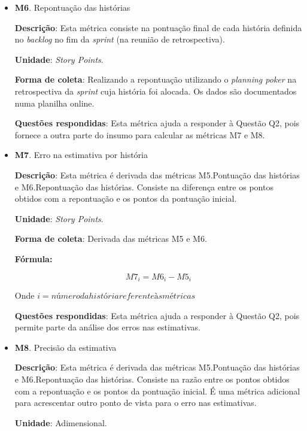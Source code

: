 \begin{itemize}
	 \item \textbf{M6}. Repontuação das histórias
	   
	   \subitem \textbf{Descrição}: Esta métrica consiste na pontuação final de cada história definida no \textit{backlog} no fim
		    da \textit{sprint} (na reunião de retrospectiva).
	   
	   \subitem \textbf{Unidade}: \textit{Story Points}.
	   
	   \subitem \textbf{Forma de coleta}: Realizando a repontuação utilizando o \textit{planning poker} na retrospectiva da \textit{sprint}
		    cuja história foi alocada. Os dados são documentados numa planilha online.
	   
	   \subitem \textbf{Questões respondidas}: Esta métrica ajuda a responder à Questão Q2, pois fornece a outra parte do insumo para calcular 
		    as métricas M7 e M8.
		    
	 \item \textbf{M7}. Erro na estimativa por história
	 
	   \subitem \textbf{Descrição}: Esta métrica é derivada das métricas M5.Pontuação das histórias e M6.Repontuação das histórias.
		    Consiste na diferença entre os pontos obtidos com a repontuação e os pontos da pontuação inicial.
	   
	   \subitem \textbf{Unidade}: \textit{Story Points}.
	   
	   \subitem \textbf{Forma de coleta}: Derivada das métricas M5 e M6.
	   
	      \subsubitem \textbf{Fórmula:} 
	      
		$$ M7_i = M6_i - M5_i $$
		
	      \subsubitem Onde $i = número da história referente às métricas$
	   
	   \subitem \textbf{Questões respondidas}: Esta métrica ajuda a responder à Questão Q2, pois permite parte da análise 
		    dos erros nas estimativas.
	 
	 \item \textbf{M8}. Precisão da estimativa
	 
	   \subitem \textbf{Descrição}: Esta métrica é derivada das métricas M5.Pontuação das histórias e M6.Repontuação das histórias.
		    Consiste na razão entre os pontos obtidos com a repontuação e os pontos da pontuação inicial. É uma métrica adicional
		    para acrescentar outro ponto de vista para o erro nas estimativas.
	   
	   \subitem \textbf{Unidade}: Adimensional.
	   

\end{itemize}
